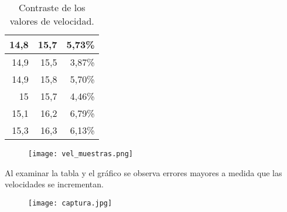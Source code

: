 \begin{table}[H]
\begin{tabular}{|r|r|r}
		14,8 & 15,7 & \multicolumn{1}{r|}{5,73\%} \\ \hline
		14,9 & 15,5 & \multicolumn{1}{r|}{3,87\%} \\ \hline
		14,9 & 15,8 & \multicolumn{1}{r|}{5,70\%} \\ \hline
		15 & 15,7 & \multicolumn{1}{r|}{4,46\%} \\ \hline
		15,1 & 16,2 & \multicolumn{1}{r|}{6,79\%} \\ \hline
		15,3 & 16,3 & \multicolumn{1}{r|}{6,13\%} \\ \hline
	\end{tabular}
	\caption{Contraste de los valores de velocidad.}
\label{difvel}
\end{table}


\begin{figure}[H]
	\centering
	\texttt{[image: vel\_muestras.png]}
	\label{fig:vel_muestras}
\end{figure}


Al examinar la tabla y el gráfico se observa errores mayores a medida que las velocidades se incrementan.

\begin{figure}[H]
	\centering
	\texttt{[image: captura.jpg]}
	\label{fig:capt}
\end{figure}


